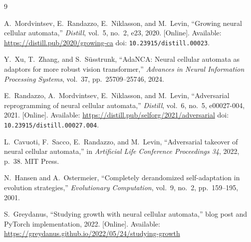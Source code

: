 \documentclass{article}
\begin{document}
\newpage
\begin{thebibliography}{9}

A.~Mordvintsev, E.~Randazzo, E.~Niklasson, and M.~Levin,
``Growing neural cellular automata,''
\textit{Distill}, vol.~5, no.~2, e23, 2020.
[Online]. Available: \url{https://distill.pub/2020/growing-ca}
doi: \texttt{10.23915/distill.00023}.


Y.~Xu, T.~Zhang, and S.~Süsstrunk,
``AdaNCA: Neural cellular automata as adaptors for more robust vision transformer,''
\textit{Advances in Neural Information Processing Systems}, vol.~37, pp.~25709--25746, 2024.


E.~Randazzo, A.~Mordvintsev, E.~Niklasson, and M.~Levin,
``Adversarial reprogramming of neural cellular automata,''
\textit{Distill}, vol.~6, no.~5, e00027-004, 2021.
[Online]. Available: \url{https://distill.pub/selforg/2021/adversarial}
doi: \texttt{10.23915/distill.00027.004}.


L.~Cavuoti, F.~Sacco, E.~Randazzo, and M.~Levin,
``Adversarial takeover of neural cellular automata,''
in \textit{Artificial Life Conference Proceedings 34}, 2022, p.~38.
MIT Press.


N.~Hansen and A.~Ostermeier,
``Completely derandomized self-adaptation in evolution strategies,''
\textit{Evolutionary Computation}, vol.~9, no.~2, pp.~159--195, 2001.


S.~Greydanus,
``Studying growth with neural cellular automata,''
blog post and PyTorch implementation, 2022.
[Online]. Available: \url{https://greydanus.github.io/2022/05/24/studying-growth}


\end{thebibliography}
\end{document}
